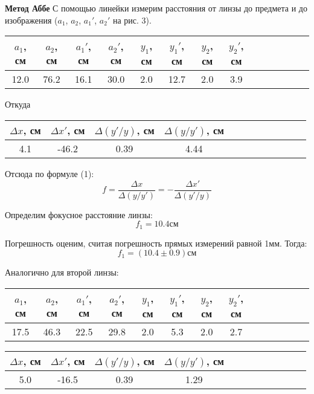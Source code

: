 \documentclass[14pt]{article}
\begin{document}
\textbf{Метод Аббе}
С помощью линейки измерим расстояния от линзы до предмета
и до изображения ($a_1$, $a_2$, $a_1'$, $a_2'$ на рис. 3).

\begin{center}
\begin{tabular}{|c|c|c|c|c|c|c|c|c|c|c|c|c|c|}
\hline
$a_1$, см	&	$a_2$, см	&	$a_1'$, см	&	$a_2'$, см	&	$y_1$, см	&	$y_1'$, см	&	$y_2$, см	&	$y_2'$, см	\\
\hline
12.0		&	76.2		&	16.1		&	30.0		&	2.0			&	12.7		&	2.0			&	3.9			\\
\hline
\end{tabular}
\end{center}

Откуда
\begin{center}
\begin{tabular}{|c|c|c|c|c|c|c|c|c|c|c|c|}
\hline
$\Delta x$, см	&	$\Delta x'$, см	&	$\Delta(y'/y)$, см	&	$\Delta(y/y')$, см	\\
\hline
4.1				&	-46.2			&	0.39				&	4.44				\\
\hline
\end{tabular}
\end{center}

Отсюда по формуле (1):
$$
	f = \frac{\Delta x}{\Delta(y/y')} = -\frac{\Delta x'}{\Delta (y'/y)}
$$

Определим фокусное расстояние линзы:
$$
	f_1 = 10.4\text{см}
$$

Погрешность оценим, считая погрешность прямых измерений равной 1мм. Тогда:
$$
	f_1 = (10.4 \pm 0.9)\text{см}
$$

Аналогично для второй линзы:

\begin{center}
\begin{tabular}{|c|c|c|c|c|c|c|c|c|c|c|c|c|c|}
\hline
$a_1$, см	&	$a_2$, см	&	$a_1'$, см	&	$a_2'$, см	&	$y_1$, см	&	$y_1'$, см	&	$y_2$, см	&	$y_2'$, см	\\
\hline
17.5		&	46.3		&	22.5		&	29.8		&	2.0			&	5.3			&	2.0			&	2.7			\\
\hline
\end{tabular}
\end{center}

\begin{center}
\begin{tabular}{|c|c|c|c|c|c|c|c|c|c|c|c|}
\hline
$\Delta x$, см	&	$\Delta x'$, см	&	$\Delta(y'/y)$, см	&	$\Delta(y/y')$, см	\\
\hline
5.0				&	-16.5			&	0.39				&	1.29				\\
\hline
\end{tabular}
\end{center}
\end{document}
